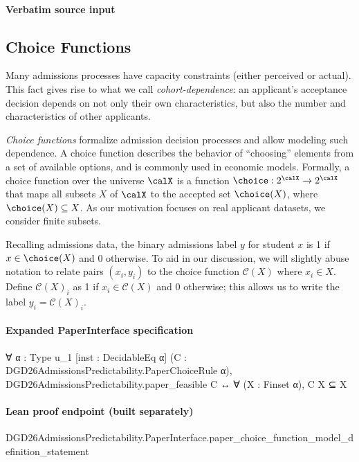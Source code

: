 \documentclass[10pt]{article}
\begin{document}
\paragraph{Verbatim source input}
\begin{ReviewVerbatim}
\subsection{Choice Functions}

Many admissions processes have capacity constraints (either perceived or actual). This fact gives rise to what we call \textit{cohort-dependence}: an applicant's acceptance decision depends on not only their own characteristics, but also the number and characteristics of other applicants.

\textit{Choice functions} formalize admission decision processes and allow modeling such dependence.
A choice function describes the behavior of ``choosing'' elements from a set of available options, and is commonly used in economic models. Formally, a choice function over the universe $\calX$ is a function $\choice: 2^\calX \to 2^\calX$ that maps all subsets $X$ of $\calX$ to the accepted set $\choice(X)$, where $\choice(X) \subseteq X$. As our motivation focuses on real applicant datasets, we consider finite subsets.

Recalling admissions data, the binary admissions label $y$ for student $x$ is 1 if $x \in \choice(X)$ and 0 otherwise.
To aid in our discussion, we will slightly abuse notation to relate pairs $(x_i,y_i)$ to the choice function $\mathcal C(X)$ where $x_i\in X$.
Define $\mathcal C(X)_i$ as 1 if $x_i\in \mathcal C(X)$ and 0 otherwise; this allows us to write the label $y_i=\mathcal C(X)_i$.
\end{ReviewVerbatim}


\paragraph{Expanded PaperInterface specification}
\begin{ReviewVerbatim}
∀ {α : Type u_1} [inst : DecidableEq α] (C : DGD26AdmissionsPredictability.PaperChoiceRule α),
  DGD26AdmissionsPredictability.paper_feasible C ↔ ∀ (X : Finset α), C X ⊆ X
\end{ReviewVerbatim}

\paragraph{Lean proof endpoint (built separately)}\begin{ReviewVerbatim}
DGD26AdmissionsPredictability.PaperInterface.paper_choice_function_model_definition_statement
\end{ReviewVerbatim}
\end{document}
